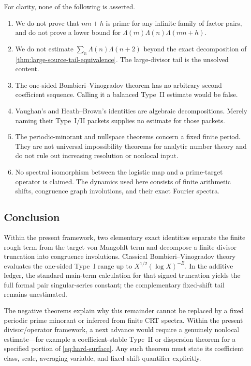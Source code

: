 For clarity, none of the following is asserted.
\begin{enumerate}[label=\textbf{B\arabic*.},leftmargin=3.2em]
 \item We do not prove that $mn+h$ is prime for any infinite family of
 factor pairs, and do not prove a lower bound for
 $\Lambda(m)\Lambda(n)\Lambda(mn+h)$.
 \item We do not estimate $\sum_n\Lambda(n)\Lambda(n+2)$ beyond the exact
 decomposition of \cref{thm:large-source-tail-equivalence}.  The large-divisor tail
 is the unsolved content.
 \item The one-sided Bombieri--Vinogradov theorem has no arbitrary second
 coefficient sequence.  Calling it a balanced Type~II estimate would be
 false.
 \item Vaughan's and Heath--Brown's identities are algebraic decompositions.
 Merely naming their Type~I/II packets supplies no estimate for those packets.
 \item The periodic-minorant and nullspace theorems concern a fixed finite
 period.  They are not universal impossibility theorems for analytic number
 theory and do not rule out increasing resolution or nonlocal input.
 \item No spectral isomorphism between the logistic map and a prime-target
 operator is claimed.  The dynamics used here consists of finite arithmetic
 shifts, congruence graph involutions, and their exact Fourier spectra.
\end{enumerate}

\subsection{Conclusion}

Within the present framework, two elementary exact identities separate the
finite rough term from the target von Mangoldt term and decompose a finite
divisor truncation into congruence involutions.  Classical
Bombieri--Vinogradov theory evaluates the one-sided Type~I range up to
$X^{1/2}(\log X)^{-B}$.  In the additive ledger, the standard main-term
calculation for that signed truncation yields the full formal pair
singular-series constant; the complementary fixed-shift tail remains
unestimated.

The negative theorems explain why this remainder cannot be replaced by a
fixed periodic prime minorant or inferred from finite CRT spectra.  Within
the present divisor/operator framework, a next advance would require a
genuinely nonlocal estimate---for example a
coefficient-stable Type~II or dispersion theorem for a specified portion of
\eqref{eq:hard-surface}.  Any such theorem must state its coefficient class,
scale, averaging variable, and fixed-shift quantifier explicitly.
